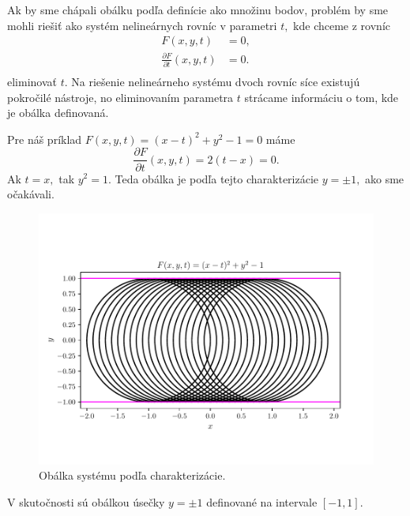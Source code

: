 Ak by sme chápali obálku podľa definície ako množinu bodov, problém by sme mohli riešiť ako systém nelineárnych rovníc v parametri $t,$ kde chceme z rovníc 
\begin{align*}
F(x,y,t) &= 0, \\
\frac{\partial F}{\partial t}(x, y, t) &= 0. \\
\end{align*}
eliminovať $t.$ Na riešenie nelineárneho systému dvoch rovníc síce existujú pokročilé nástroje, no eliminovaním parametra $t$ strácame informáciu o tom, kde je obálka definovaná. 

\begin{example}
Pre náš príklad $ F(x, y, t) = (x - t)^2 + y^2 - 1 = 0 $ máme 
$$\frac{\partial F}{\partial t}(x, y, t) = 2(t-x) = 0. $$
Ak $t = x, $ tak $y^2 = 1.$ Teda obálka je podľa tejto charakterizácie $ y = \pm 1, $ ako sme očakávali.
\end{example}

\begin{figure}[H]
	\centering
	\includegraphics{images/system_with_envelope_unlimited_domain.pdf}
	\caption{Obálka systému podľa charakterizácie.}
	\label{fig:system_with_envelope_unlimited_domain}
\end{figure}

V skutočnosti sú obálkou úsečky $y=\pm 1$ definované na intervale $[-1,1]$.

